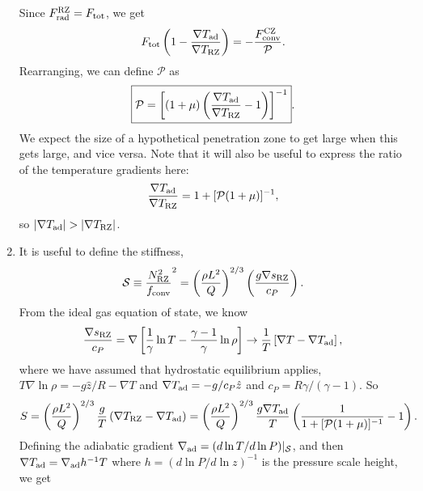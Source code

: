\documentclass[onecolumn, amsmath, amsfonts, amssymb]{aastex62}
\newcommand{\grad}{\ensuremath{\nabla}}
\newcommand{\mP}{\ensuremath{\mathcal{P}}}
\begin{document}
\begin{enumerate}
        Since $F_{\rm{rad}}^{\rm{RZ}} = F_{\rm{tot}}$, we get
        \begin{equation}
            F_{\rm{tot}}\left(1 - \frac{\grad T_{\rm{ad}}}{\grad T_{\rm{RZ}}}\right)
            = - \frac{F_{\rm{conv}}^{\rm{CZ}}}{\mathcal{P}}.
        \end{equation}
        Rearranging, we can define $\mP$ as
        \begin{equation}
            \boxed{
                \mathcal{P} = \left[(1 + \mu) \left(\frac{\grad T_{\rm{ad}}}{\grad T_{\rm{RZ}}} - 1\right)\right]^{-1}}.
        \end{equation}
        We expect the size of a hypothetical penetration zone to get large when this gets large, and vice versa.
        Note that it will also be useful to express the ratio of the temperature gradients here:
        \begin{equation}
            \frac{\grad T_{\rm{ad}}}{\grad T_{\rm{RZ}}} = 1 + [\mathcal{P}(1 + \mu)]^{-1},
        \end{equation}
        so $|\grad T_{\rm{ad}}| > |\grad T_{\rm{RZ}}|$.
    \item It is useful to define the stiffness,
        \begin{equation}
            \mathcal{S} \equiv \frac{N_{\rm{RZ}}^2}{f_{\rm{conv}}}^2
            = \left(\frac{\rho L^2}{Q}\right)^{2/3}\left(\frac{g \grad s_{\rm{RZ}}}{c_P}\right).
        \end{equation}
        From the ideal gas equation of state, we know
        \begin{equation}
            \frac{\grad s_{\rm{RZ}}}{c_P} = \grad\left[\frac{1}{\gamma}\ln T - \frac{\gamma-1}{\gamma}\ln\rho\right]
            \rightarrow
            \frac{1}{T}\left[\grad T - \grad T_{\rm{ad}}\right],
        \end{equation}
        where we have assumed that hydrostatic equilibrium applies, $T\grad \ln \rho = -g\hat{z} / R - \grad T$ and $\grad T_{\rm{ad}} = -g/c_P\hat{z}$ and $c_P = R \gamma/(\gamma-1)$.
        So
        \begin{equation}
            S = \left(\frac{\rho L^2}{Q}\right)^{2/3}\frac{g }{T}\left(\grad T_{\rm{RZ}} - \grad T_{\rm{ad}}\right)
                = \left(\frac{\rho L^2}{Q}\right)^{2/3}\frac{g \grad T_{\rm{ad}}}{T}\left(\frac{1}{1 + [\mathcal{P}(1 + \mu)]^{-1}} - 1\right).
        \end{equation}
        Defining the adiabatic gradient $\grad_{\rm{ad}} = (d\ln T / d\ln P)|_{\mathcal{S}}$, and then $\grad T_{\rm{ad}} = \grad_{\rm{ad}} h^{-1} T$ where $h = (d\ln P/d\ln z)^{-1}$ is the pressure scale height, we get

\end{enumerate}
\end{document}
